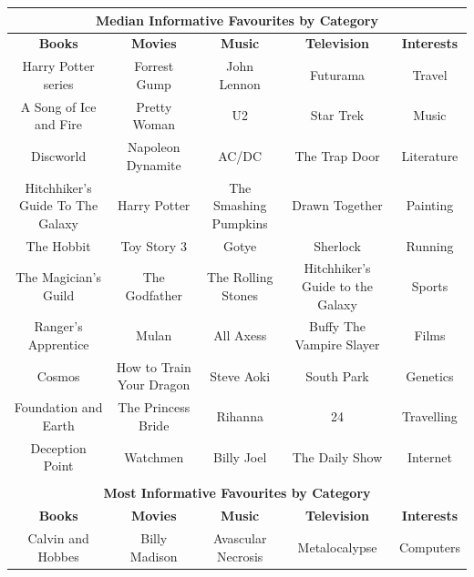 \begin{table}[t!] \centering 

{\small
\begin{tabular}{|c|c|c|c|c|}
\hline 
\multicolumn{5}{|c|}{\textbf{Median Informative Favourites by Category}}\\
\hline 
\textbf{Books} & \textbf{Movies} & \textbf{Music} & \textbf{Television} & \textbf{Interests} \\
\hline \hline
Harry Potter series&Forrest Gump&John Lennon&Futurama&Travel\\
\hline
A Song of Ice and Fire&Pretty Woman&U2&Star Trek&Music\\
\hline
Discworld&Napoleon Dynamite&AC/DC&The Trap Door&Literature\\
\hline
Hitchhiker's Guide To The Galaxy&Harry Potter&The Smashing Pumpkins&Drawn Together&Painting\\
\hline
The Hobbit&Toy Story 3&Gotye&Sherlock&Running\\
\hline
The Magician's Guild&The Godfather&The Rolling Stones&Hitchhiker's Guide to the Galaxy&Sports\\
\hline
Ranger's Apprentice&Mulan&All Axess&Buffy The Vampire Slayer&Films\\
\hline
Cosmos&How to Train Your Dragon&Steve Aoki&South Park&Genetics\\
\hline
Foundation and Earth&The Princess Bride&Rihanna&24&Travelling\\
\hline
Deception Point&Watchmen&Billy Joel&The Daily Show&Internet\\
\hline
\multicolumn{5}{c}{}\\
\hline 
\multicolumn{5}{|c|}{\textbf{Most Informative Favourites by Category}}\\
\hline
\textbf{Books} & \textbf{Movies} & \textbf{Music} & \textbf{Television} & \textbf{Interests} \\
\hline \hline
Calvin and Hobbes & Billy Madison & Avascular Necrosis & Metalocalypse & Computers\\

\end{tabular}}
\end{table}
